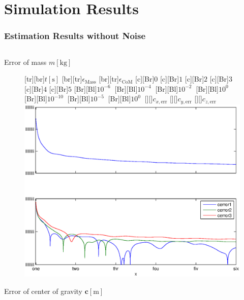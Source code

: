 \documentclass[student,noshadow]{ITRslides}
\renewcommand{\vec}[1]{\boldsymbol{#1}}
\renewcommand{\vec}[1]{\boldsymbol{#1}}
\newcommand{\scr}[1]{\mathrm{#1}}
\begin{document}
\section{Simulation Results}
\begin{frame}
	\frametitle{Estimation Results without Noise}
	
	\begin{columns}
		\centering
		\begin{column}{0.5\textwidth}
			\centering
			Error of mass $m \left[\mathrm{kg}\right]$
			\begin{figure}
				[tr][br]{$t\left[\mathrm{s}\right]$}
				[br][tr]{$\epsilon_\scr{Mass}$}
				[br][tr]{$\epsilon_\scr{CoM}$}
				[c][Br]{$0$}
				[c][Br]{$1$}
				[c][Br]{$2$}
				[c][Br]{$3$}
				[c][Br]{$4$}
				[c][Br]{$5$}
				[Br][Bl]{$10^{-6}\  $}
				[Br][Bl]{$10^{-4}\  $}
				[Br][Bl]{$10^{-2}\  $}
				[Br][Bl]{$10^0\  $}
				[Br][Bl]{$10^{-10}\  $}
				[Br][Bl]{$10^{-5}\  $}
				[Br][Bl]{$10^0\  $}
				[][]{\tiny $c_{x,\scr{err}}$}
				[][]{\tiny $c_{y,\scr{err}}$}
				[][]{\tiny $c_{z,\scr{err}}$}
				\includegraphics[width=\textwidth]{fig/mass_multi.eps}
				\label{fig:estim_mass_multi}
			\end{figure}
			Error of center of gravity $\vec{c} \left[\mathrm{m}\right]$
		\end{column}

\end{columns}
\end{frame}
\end{document}
